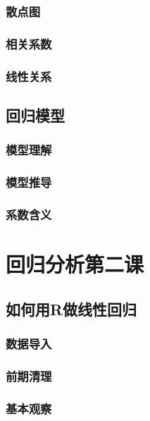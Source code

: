 \documentclass[]{book}
\begin{document}
\subsection{散点图}

\subsection{相关系数}

\subsection{线性关系}

\section{回归模型}

\subsection{模型理解}

\subsection{模型推导}

\subsection{系数含义}

\chapter{回归分析第二课}

\hypertarget{r}{%
\section{如何用R做线性回归}\label{r}}

\subsection{数据导入}

\subsection{前期清理}

\subsection{基本观察}
\end{document}
